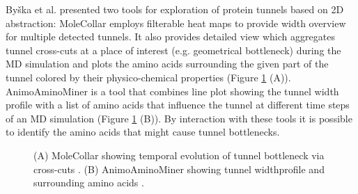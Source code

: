 Byška et al. presented two tools for exploration of protein tunnels based on 2D abstraction: MoleCollar \cite{byvska2015molecollar} employs filterable heat maps to provide width overview for multiple detected tunnels. It also provides detailed view which aggregates tunnel cross-cuts at a place of interest (e.g. geometrical bottleneck) during the MD simulation and plots the amino acids surrounding the given part of the tunnel  colored by their physico-chemical properties (Figure \ref{Fig:tunnels2} (A)). AnimoAminoMiner \cite{byvska2016animoaminominer} is a tool that combines line plot showing the tunnel width profile with a list of amino acids that influence the tunnel at different time steps of an MD simulation (Figure \ref{Fig:tunnels2} (B)). By interaction with these tools it is possible to identify the amino acids that might cause tunnel bottlenecks.

\begin{figure}[h]
  \centering
  \hspace{0.07\linewidth}
  \caption{(A) MoleCollar showing temporal evolution of tunnel bottleneck via cross-cuts \cite{byvska2015molecollar}. (B) AnimoAminoMiner showing tunnel widthprofile and surrounding amino acids \cite{byvska2016animoaminominer}.}
  \label{Fig:tunnels2}  
\end{figure}

